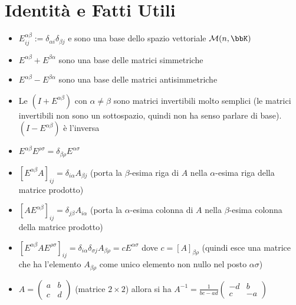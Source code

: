\documentclass[a4paper,NoNotes,GeneralMath]{stdmdoc}
\begin{document}
	\section*{Identità e Fatti Utili}
	\begin{itemize}
		\item $E_{ij}^{\alpha\beta} := \delta_{\alpha i} \delta_{\beta j}$ e sono una base dello spazio vettoriale $\mathcal{M}(n,\bbK)$
		\item $E^{\alpha\beta} + E^{\beta\alpha}$ sono una base delle matrici simmetriche
		\item $E^{\alpha\beta} - E^{\beta\alpha}$ sono una base delle matrici antisimmetriche
		\item Le $(I + E^{\alpha\beta})$ con $\alpha \neq \beta$ sono matrici invertibili molto semplici (le matrici invertibili non sono un sottospazio, quindi non ha senso parlare di base). $(I - E^{\alpha\beta})$ è l'inversa
		\item $E^{\alpha\beta}E^{\rho\sigma} = \delta_{\beta\rho} E^{\alpha\sigma}$
		\item $[E^{\alpha\beta}A]_{ij} = \delta_{i\alpha}A_{\beta j}$ (porta la $\beta$-esima riga di $A$ nella $\alpha$-esima riga della matrice prodotto)
		\item $[AE^{\alpha\beta}]_{ij} = \delta_{j\beta}A_{i\alpha}$ (porta la $\alpha$-esima colonna di $A$ nella $\beta$-esima colonna della matrice prodotto)
		\item $[E^{\alpha\beta}AE^{\rho\sigma}]_{ij} = \delta_{i\alpha}\delta_{\sigma j}A_{\beta\rho} = cE^{\alpha\sigma}$ dove $c = [A]_{\beta\rho}$ (quindi esce una matrice che ha l'elemento $A_{\beta\rho}$ come unico elemento non nullo nel posto $\alpha\sigma$)
		\item $A = \left( \begin{array}{cc} a & b \\ c & d \end{array} \right)$ (matrice $2\times 2$) allora si ha $A^{-1} = \frac{1}{bc-ad} \left( \begin{array}{cc} -d & b \\ c & -a \end{array} \right)$
		

\end{itemize}
\end{document}
